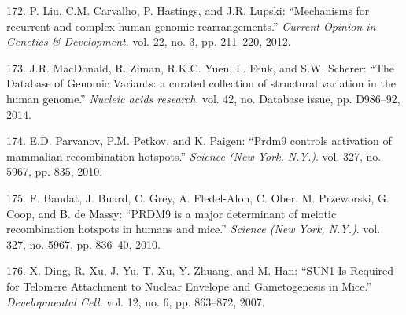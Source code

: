 \documentclass[12pt,twoside]{ugathesis}
\theoremstyle{definition}
\theoremstyle{definition}
\theoremstyle{remark}
\begin{document}
\hypertarget{ref-Liu2012}{}
172. P. Liu, C.M. Carvalho, P. Hastings, and J.R. Lupski: ``Mechanisms
for recurrent and complex human genomic rearrangements.'' \emph{Current
Opinion in Genetics \& Development}. vol. 22, no. 3, pp. 211--220, 2012.

\hypertarget{ref-MacDonald2014}{}
173. J.R. MacDonald, R. Ziman, R.K.C. Yuen, L. Feuk, and S.W. Scherer:
``The Database of Genomic Variants: a curated collection of structural
variation in the human genome.'' \emph{Nucleic acids research}. vol. 42,
no. Database issue, pp. D986--92, 2014.

\hypertarget{ref-Parvanov2010}{}
174. E.D. Parvanov, P.M. Petkov, and K. Paigen: ``Prdm9 controls
activation of mammalian recombination hotspots.'' \emph{Science (New
York, N.Y.)}. vol. 327, no. 5967, pp. 835, 2010.

\hypertarget{ref-Baudat2010}{}
175. F. Baudat, J. Buard, C. Grey, A. Fledel-Alon, C. Ober, M.
Przeworski, G. Coop, and B. de Massy: ``PRDM9 is a major determinant of
meiotic recombination hotspots in humans and mice.'' \emph{Science (New
York, N.Y.)}. vol. 327, no. 5967, pp. 836--40, 2010.

\hypertarget{ref-Ding2007}{}
176. X. Ding, R. Xu, J. Yu, T. Xu, Y. Zhuang, and M. Han: ``SUN1 Is
Required for Telomere Attachment to Nuclear Envelope and Gametogenesis
in Mice.'' \emph{Developmental Cell}. vol. 12, no. 6, pp. 863--872,
2007.


\end{document}
